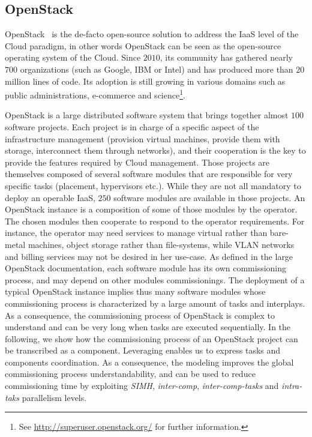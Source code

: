 
\graphicspath{{images/}}


\subsection{OpenStack}
\label{subsec:openstack}

OpenStack~\cite{os:7923796} is the de-facto open-source solution to
address the IaaS level of the Cloud paradigm, in other words OpenStack
can be seen as the open-source operating system of the Cloud. Since
$2010$, its community has gathered nearly $700$ organizations (such as
Google, IBM or Intel) and has produced more than $20$ million lines of
code. Its adoption is still growing in various domains such as public
administrations, e-commerce and science\footnote{See
  \url{http://superuser.openstack.org/} for further information.}.

OpenStack is a large distributed software system that brings together
almost $100$ software projects. Each project is in charge of a
specific aspect of the infrastructure management (\eg provision
virtual machines, provide them with storage, interconnect them through
networks), and their cooperation is the key to provide the features
required by Cloud management.
%
Those projects are themselves composed of several software modules
that are responsible for very specific tasks (\eg placement,
hypervisors etc.). While they are not all mandatory to deploy an
operable IaaS, $250$ software modules are available in those projects.
%
An OpenStack instance is a composition of some of those modules by the
operator. The chosen modules then cooperate to respond to the operator
requirements. For instance, the operator may need services to manage
virtual rather than bare-metal machines, object storage rather than
file-systems, while VLAN networks and billing services may not be
desired in her use-case. As defined in the large OpenStack
documentation, each software module has its own commissioning process,
and may depend on other modules commissionings.
%
The deployment of a typical OpenStack instance implies thus many
software modules whose commissioning process is characterized by a
large amount of tasks and interplays. As a consequence, the
commissioning process of OpenStack is complex to understand and can be
very long when tasks are executed sequentially.
%
In the following, we show how the commissioning process of an
OpenStack project can be transcribed as a \mad component. Leveraging
\mad enables us to express tasks and components coordination. As a
consequence, the \mad modeling improves the global commissioning
process understandability, and can be used to reduce commissioning
time by exploiting \emph{SIMH}, \emph{inter-comp}, \emph{inter-comp-tasks}
and \emph{intra-taks} parallelism levels.

